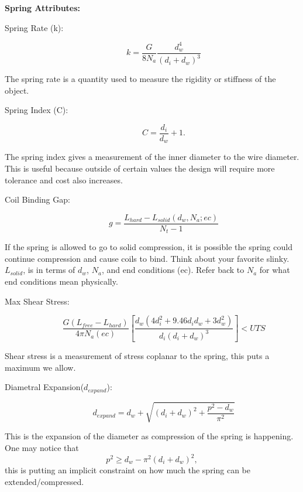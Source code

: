 \documentclass[10pt]{article}
\begin{document}
		\begin{center}\textbf{Spring Attributes:}\end{center}
			\begin{description}
				\item [Spring Rate (k):] \begin{equation} k = \frac{G}{8N_{a}}\frac{d_{w}^{4}}{(d_{i} + d_{w})^{3}}\end{equation}
				\end{description}
			The spring rate is a quantity used to measure the rigidity or stiffness of the object. 
			\begin{description}	
			\item[Spring Index (C):]\begin{equation}C = \frac{d_{i}}{d_{w}} + 1.\end{equation}
			\end{description}
				 The spring index gives a measurement of the inner diameter to the wire diameter. This is useful because outside of certain values the design will require more tolerance and cost also increases. \cite{SpringIndex}
			\begin{description}	
			\item[Coil Binding Gap:]\begin{equation} g = \frac{L_{hard} - L_{solid}(d_{w},N_{a}; ec)}{N_{t} - 1}\end{equation}
			\end{description}
				If the spring is allowed to go to solid compression, it is possible the spring could continue compression and cause coils to bind. Think about your favorite slinky. $L_{solid}$, is in terms of $d_{w}$, $N_{a}$, and end conditions (ec). Refer back to $N_{a}$ for what end conditions mean physically.
		

		\begin{description}
			 \item[Max Shear Stress:]\begin{equation} \frac{G(L_{free} - L_{hard})}{4 \pi N_{a} (ec)} \left[\frac{d_{w} (4d_{i}^{2} + 9.46d_{i} 
d_{w} + 3 d_{w}^{2})}{d_{i}(d_{i}+d_{w})^{3}}\right]< UTS\end{equation}
		\end{description}
				Shear stress is a measurement of stress coplanar to the spring, this puts a maximum we allow. 
			\begin{description}
			\item[Diametral Expansion($d_{expand}$):]\begin{equation} d_{expand} = d_{w} + \sqrt{(d_{i} + d_{w})^{2} + \frac{p^{2} - d_{w}}{\pi^{2}}}
			\end{equation}
			\end{description}
			This is the expansion of the diameter as compression of the spring is happening. One may notice that \begin{equation}p^{2} \ge d_{w} - \pi^{2} (d_{i} + d_{w})^{2},\end{equation} this is putting an implicit constraint on how much the spring can be extended/compressed.
			
\end{document}
